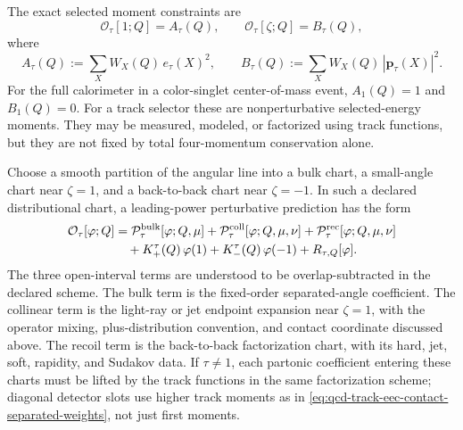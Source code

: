 The exact selected moment constraints are
\begin{equation}
  \mathcal O_\tau[1;Q]
  =
  A_\tau(Q),
  \qquad
  \mathcal O_\tau[\zeta;Q]
  =
  B_\tau(Q),
  \label{eq:qcd-selected-eec-measured-moments}
\end{equation}
where
\[
  A_\tau(Q):=\sum_XW_X(Q)\,e_\tau(X)^2,
  \qquad
  B_\tau(Q):=\sum_XW_X(Q)\,|\mathbf p_\tau(X)|^2 .
\]
For the full calorimeter in a color-singlet center-of-mass event,
\(A_1(Q)=1\) and \(B_1(Q)=0\).  For a track selector these are
nonperturbative selected-energy moments.  They may be measured, modeled, or
factorized using track functions, but they are not fixed by total
four-momentum conservation alone.

Choose a smooth partition of the angular line into a bulk chart, a
small-angle chart near \(\zeta=1\), and a back-to-back chart near
\(\zeta=-1\).  In such a declared distributional chart, a leading-power
perturbative prediction has the form
\begin{equation}
\begin{aligned}
  \mathcal O_\tau[\varphi;Q]
  &=
  \mathcal P_{\tau}^{\rm bulk}[\varphi;Q,\mu]
  +
  \mathcal P_{\tau}^{\rm coll}[\varphi;Q,\mu,\nu]
  +
  \mathcal P_{\tau}^{\rm rec}[\varphi;Q,\mu,\nu]
  \\
  &\quad
  +
  K_{+}^{\tau}(Q)\,\varphi(1)
  +
  K_{-}^{\tau}(Q)\,\varphi(-1)
  +
  R_{\tau,Q}[\varphi].
\end{aligned}
\label{eq:qcd-measured-eec-factorization-budget}
\end{equation}
The three open-interval terms are understood to be overlap-subtracted in the
declared scheme.  The bulk term is the fixed-order separated-angle
coefficient.  The collinear term is the light-ray or jet endpoint expansion
near \(\zeta=1\), with the operator mixing, plus-distribution convention,
and contact coordinate discussed above.  The recoil term is the
back-to-back factorization chart, with its hard, jet, soft, rapidity, and
Sudakov data.  If \(\tau\ne1\), each partonic coefficient entering these
charts must be lifted by the track functions in the same factorization
scheme; diagonal detector slots use higher track moments as in
\eqref{eq:qcd-track-eec-contact-separated-weights}, not just first moments.

